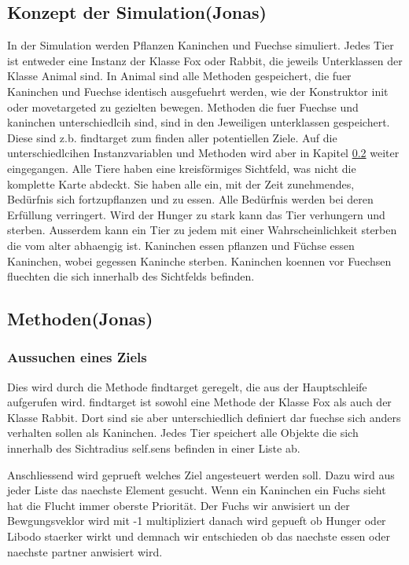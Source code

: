 \documentclass[12pt]{article}
\begin{document}
\subsection{Konzept der Simulation(Jonas)}
In der Simulation werden Pflanzen Kaninchen und Fuechse simuliert.
Jedes Tier ist entweder eine Instanz der Klasse Fox oder Rabbit, die jeweils Unterklassen der Klasse Animal sind.
In Animal sind alle Methoden gespeichert, die fuer Kaninchen und Fuechse identisch ausgefuehrt werden, wie der Konstruktor init oder movetargeted zu gezielten bewegen.
Methoden die fuer Fuechse und kaninchen unterschiedlcih sind, sind in den Jeweiligen unterklassen gespeichert.
Diese sind z.b. findtarget zum finden aller potentiellen Ziele.
Auf die unterschiedlcihen Instanzvariablen und Methoden wird aber in Kapitel \ref{methoden} weiter eingegangen.
Alle Tiere haben eine kreisförmiges Sichtfeld, was nicht die komplette Karte abdeckt.
Sie haben alle ein, mit der Zeit zunehmendes, Bedürfnis sich fortzupflanzen und zu essen.
Alle Bedürfnis werden bei deren Erfüllung verringert.
Wird der Hunger zu stark kann das Tier verhungern und sterben.
Ausserdem kann ein Tier zu jedem mit einer Wahrscheinlichkeit sterben die vom alter abhaengig ist.
Kaninchen essen pflanzen und Füchse essen Kaninchen, wobei gegessen Kaninche sterben.
Kaninchen koennen vor Fuechsen fluechten die sich innerhalb des Sichtfelds befinden.

\subsection{Methoden(Jonas)}
\label{methoden}
\subsubsection{Aussuchen eines Ziels}
Dies wird durch die Methode findtarget geregelt, die aus der Hauptschleife aufgerufen wird.
findtarget ist sowohl eine Methode der Klasse Fox als auch der Klasse Rabbit.
Dort sind sie aber unterschiedlich definiert dar fuechse sich anders verhalten sollen als Kaninchen.
Jedes Tier speichert alle Objekte die sich innerhalb des Sichtradius self.sens befinden in einer Liste ab.

Anschliessend wird geprueft welches Ziel angesteuert werden soll.
Dazu wird aus jeder Liste das naechste Element gesucht.
Wenn ein Kaninchen ein Fuchs sieht hat die Flucht immer oberste Priorität.
Der Fuchs wir anwisiert un der Bewgungsveklor wird mit -1 multipliziert
danach wird gepueft ob Hunger oder Libodo staerker wirkt und demnach wir entschieden ob das naechste essen oder naechste partner anwisiert wird.
\end{document}

